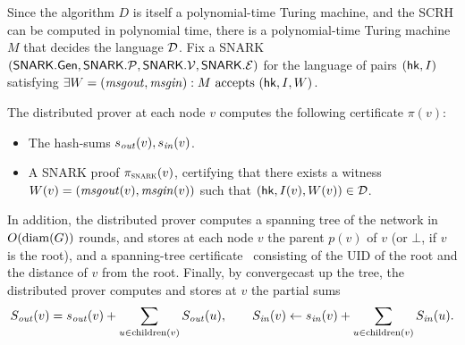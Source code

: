 Since the algorithm $D$ is itself a polynomial-time Turing machine,
and the SCRH can be computed in polynomial time,
there is a polynomial-time Turing machine $M$ that decides the language $\mathcal{D}$.
Fix a SNARK $(\mathsf{SNARK}.\mathsf{Gen}, \mathsf{SNARK}.\mathcal{P}, \mathsf{SNARK}.\mathcal{V}, \mathsf{SNARK}.\mathcal{E})$
for the language
of pairs $(\mathsf{hk}, I)$ satisfying
$\exists W = (\mathit{ msgout }, \mathit{ msgin }) : \text{$M$ accepts $(\mathsf{hk}, I, W)$}$.

The distributed prover at each node $v$ computes the following certificate $\pi(v)$:
\begin{itemize}
	\item The hash-sums $s_{\mathit{ out }}(v), s_{\mathit{ in }}(v)$.
	\item A SNARK proof $\pi_\textsc{snark}(v)$, certifying that there exists a witness $W(v) = (\mathit{ msgout }(v), \mathit{ msgin }(v))$
		such that $(\mathsf{hk}, I(v), W(v)) \in \mathcal{D}$.
\end{itemize}
In addition, the distributed prover computes a spanning tree of the network in $O(\operatorname{diam}(G))$
rounds, and stores at each node $v$ the parent $p(v)$ of $v$ (or $\bot$, if $v$ is the root),
and a spanning-tree certificate~\cite{korman2005proof} consisting
of the UID of the root and the distance of $v$ from the root.
Finally, by convergecast up the tree,
the distributed prover computes and stores at $v$
the partial sums 
\begin{equation*}
	S_{\mathit{ out }}(v) = s_{\mathit{ out }}(v) + \sum_{u \in \mathrm{children}(v)} S_{\mathit{ out }}(u),
	\qquad
	S_{\mathit{ in }}(v) \leftarrow s_{\mathit{ in }}(v) + \sum_{u \in \mathrm{children}(v)} S_{\mathit{ in }}(u).
\end{equation*}


